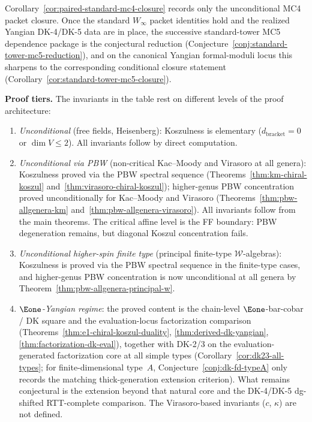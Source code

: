 \begin{remark}
\label{rem:paired-standard-mc4-closure-mc5}
Corollary~\ref{cor:paired-standard-mc4-closure} records only the
unconditional MC4 packet closure. Once the standard
\texorpdfstring{$W_\infty$}{W_infty} packet identities hold and the
realized Yangian DK-4/DK-5 data are in place, the successive
standard-tower MC5 dependence package is the conjectural reduction
\textup{(}Conjecture~\textup{\ref{conj:standard-tower-mc5-reduction}}\textup{)},
and on the canonical Yangian formal-moduli locus this sharpens to the
corresponding conditional closure statement
\textup{(}Corollary~\textup{\ref{cor:standard-tower-mc5-closure}}\textup{)}.
\end{remark}

\smallskip
\noindent\textbf{Proof tiers.} The invariants in the table rest on
different levels of the proof architecture:

\begin{enumerate}
\item[\textbf{T1.}] \emph{Unconditional} (free fields, Heisenberg):
 Koszulness is elementary ($d_{\mathrm{bracket}} = 0$ or $\dim V \le 2$).
 All invariants follow by direct computation.
\item[\textbf{T1$\frac{1}{2}$.}] \emph{Unconditional via PBW}
 (non-critical Kac--Moody and Virasoro at all genera):
 Koszulness proved via the PBW spectral sequence
 (Theorems~\ref{thm:km-chiral-koszul}
 and~\ref{thm:virasoro-chiral-koszul}); higher-genus PBW concentration
 proved unconditionally for Kac--Moody and Virasoro
 (Theorems~\ref{thm:pbw-allgenera-km}
 and~\ref{thm:pbw-allgenera-virasoro}).
 All invariants follow from the main theorems.
 The critical affine level is the FF boundary: PBW degeneration remains,
 but diagonal Koszul concentration fails.
\item[\textbf{T2.}] \emph{Unconditional higher-spin finite type}
 (principal finite-type $\mathcal{W}$-algebras):
 Koszulness is proved via the PBW spectral sequence in the finite-type
 cases, and higher-genus PBW concentration is now unconditional at all
 genera by Theorem~\ref{thm:pbw-allgenera-principal-w}.
\item[\textbf{DK-core.}] \emph{$\Eone$-Yangian regime}:
 the proved content is the chain-level $\Eone$-bar-cobar / DK square
 and the evaluation-locus factorization comparison
 \textup{(}Theorems~\ref{thm:e1-chiral-koszul-duality},
 \ref{thm:derived-dk-yangian}, \ref{thm:factorization-dk-eval}\textup{)},
 together with DK-2/3 on the evaluation-generated factorization core
 at all simple types
 \textup{(}Corollary~\ref{cor:dk23-all-types}; for finite-dimensional
 type~$A$, Conjecture~\ref{conj:dk-fd-typeA} only records the matching
 thick-generation extension criterion\textup{)}.
 What remains conjectural is the extension beyond that natural core
 and the DK-4/DK-5 dg-shifted RTT-complete comparison.
 The Virasoro-based invariants ($c$, $\kappa$) are not defined.
\end{enumerate}

